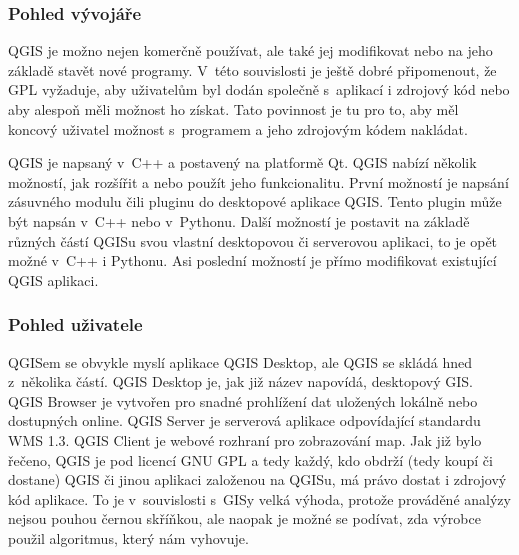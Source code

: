 \documentclass[a4paper,12pt]{article}
\begin{document}
\subsubsection{Pohled vývojáře}

QGIS je možno nejen komerčně používat, ale také jej modifikovat nebo na jeho základě stavět nové programy.
V~této souvislosti je ještě dobré připomenout, že GPL vyžaduje, aby uživatelům byl dodán společně s~aplikací i zdrojový kód nebo aby alespoň měli možnost ho získat.
Tato povinnost je tu pro to, aby měl koncový uživatel možnost s~programem a jeho zdrojovým kódem nakládat.

QGIS je napsaný v~C++ a postavený na platformě Qt.
QGIS nabízí několik možností, jak rozšířit a nebo použít jeho funkcionalitu.
První možností je napsání zásuvného modulu čili pluginu do desktopové aplikace QGIS.
Tento plugin může být napsán v~C++ nebo v~Pythonu.
Další možností je postavit na základě různých částí QGISu svou vlastní desktopovou či serverovou aplikaci, to je opět možné v~C++ i Pythonu.
Asi poslední možností je přímo modifikovat existující QGIS aplikaci.

\subsubsection{Pohled uživatele}

QGISem se obvykle myslí aplikace QGIS Desktop, ale QGIS se skládá hned z~několika částí.
QGIS Desktop je, jak již název napovídá, desktopový GIS.
QGIS Browser je vytvořen pro snadné prohlížení dat uložených lokálně nebo dostupných online.
QGIS Server je serverová aplikace odpovídající standardu WMS 1.3.
QGIS Client je webové rozhraní pro zobrazování map.
Jak již bylo řečeno, QGIS je pod licencí GNU GPL a tedy každý, kdo obdrží (tedy koupí či dostane) QGIS či jinou aplikaci založenou na QGISu, má právo dostat i zdrojový kód aplikace.
To je v~souvislosti s~GISy velká výhoda, protože prováděné analýzy nejsou pouhou černou skříňkou,
ale naopak je možné se podívat, zda výrobce použil algoritmus, který nám vyhovuje.
\end{document}
